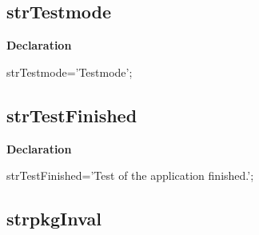 \documentclass{report}
\newif\ifpdf
\begin{document}
\subsection*{strTestmode}
\fi
\label{trstrings-strTestmode}
\begin{list}{}{
\setlength{\itemindent}{0cm}
\setlength{\listparindent}{0cm}
\setlength{\leftmargin}{\evensidemargin}
\addtolength{\leftmargin}{\tmplength}
\settowidth{\labelsep}{X}
\addtolength{\leftmargin}{\labelsep}
\setlength{\labelwidth}{\tmplength}
}
\item[\textbf{Declaration}\hfill]
\ifpdf
\begin{flushleft}
\fi
\begin{ttfamily}
strTestmode='Testmode';\end{ttfamily}

\ifpdf
\end{flushleft}
\fi

\end{list}
\ifpdf
\subsection*{\large{\textbf{strTestFinished}}\normalsize\hspace{1ex}\hrulefill}
\else
\subsection*{strTestFinished}
\fi
\label{trstrings-strTestFinished}
\begin{list}{}{
\setlength{\itemindent}{0cm}
\setlength{\listparindent}{0cm}
\setlength{\leftmargin}{\evensidemargin}
\addtolength{\leftmargin}{\tmplength}
\settowidth{\labelsep}{X}
\addtolength{\leftmargin}{\labelsep}
\setlength{\labelwidth}{\tmplength}
}
\item[\textbf{Declaration}\hfill]
\ifpdf
\begin{flushleft}
\fi
\begin{ttfamily}
strTestFinished='Test of the application finished.';\end{ttfamily}

\ifpdf
\end{flushleft}
\fi

\end{list}
\ifpdf
\subsection*{\large{\textbf{strpkgInval}}\normalsize\hspace{1ex}\hrulefill}
\else
\end{document}

